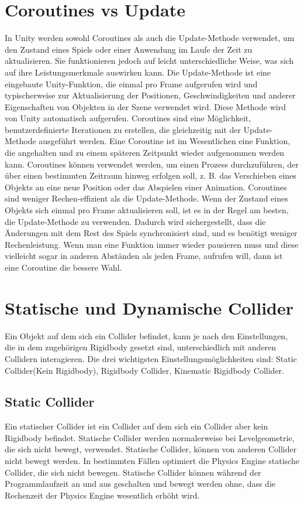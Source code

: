 \section{Coroutines vs Update}
In Unity werden sowohl Coroutines als auch die Update-Methode verwendet, um den Zustand eines Spiels oder einer Anwendung im Laufe der Zeit zu aktualisieren. Sie funktionieren jedoch auf leicht unterschiedliche Weise, was sich auf ihre Leistungsmerkmale auswirken kann. Die Update-Methode ist eine eingebaute Unity-Funktion, die einmal pro Frame aufgerufen wird und typischerweise zur Aktualisierung der Positionen, Geschwindigkeiten und anderer Eigenschaften von Objekten in der Szene verwendet wird. Diese Methode wird von Unity automatisch aufgerufen. Coroutines sind eine Möglichkeit, benutzerdefinierte Iterationen zu erstellen, die gleichzeitig mit der Update-Methode ausgeführt werden. Eine Coroutine ist im Wesentlichen eine Funktion, die angehalten und zu einem späteren Zeitpunkt wieder aufgenommen werden kann. Coroutines können verwendet werden, um einen Prozess durchzuführen, der über einen bestimmten Zeitraum hinweg erfolgen soll, z. B. das Verschieben eines Objekts an eine neue Position oder das Abspielen einer Animation. Coroutines sind weniger Rechen-effizient als die Update-Methode. Wenn der Zustand eines Objekts sich einmal pro Frame aktualisieren soll, ist es in der Regel am besten, die Update-Methode zu verwenden. Dadurch wird sichergestellt, dass die Änderungen mit dem Rest des Spiels synchronisiert sind, und es benötigt weniger Rechenleistung. Wenn man eine Funktion immer wieder pausieren muss und diese vielleicht sogar in anderen Abständen als jeden Frame, aufrufen will, dann ist eine Coroutine die bessere Wahl.
\cite{dickinson2015unity}

\section{Statische und Dynamische Collider}
Ein Objekt auf dem sich ein Collider befindet, kann je nach den Einstellungen, die in dem zugehörigen Rigidbody gesetzt sind, unterschiedlich mit anderen Collidern interagieren. Die drei wichtigsten Einstellungsmöglichkeiten sind: Static Collider(Kein Rigidbody), Rigidbody Collider, Kinematic Rigidbody Collider.

\subsection{Static Collider}
Ein statischer Collider ist ein Collider auf dem sich ein Collider aber kein Rigidbody befindet. Statische Collider werden normalerweise bei Levelgeometrie, die sich nicht bewegt, verwendet. Statische Collider, können von anderen Collider nicht bewegt werden. In bestimmten Fällen optimiert die Physics Engine statische Collider, die sich nicht bewegen. Statische Collider können während der Programmlaufzeit an und aus geschalten und bewegt werden ohne, dass die Rechenzeit der Physics Engine wesentlich erhöht wird.


